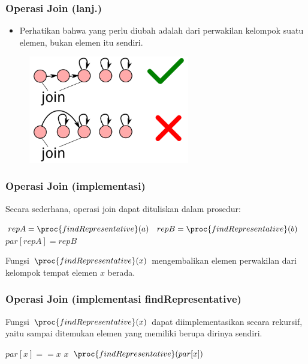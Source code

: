\begin{frame}
\frametitle{Operasi Join (lanj.)}
\begin{itemize}
  \item Perhatikan bahwa yang perlu diubah adalah  dari perwakilan kelompok suatu elemen, bukan elemen itu sendiri.
\end{itemize}
\begin{figure}
  \includegraphics[width=7cm]{asset/djs-join-2.pdf}
\end{figure}
\end{frame}

\begin{frame}
\frametitle{Operasi Join (implementasi)}
Secara sederhana, operasi join dapat dituliskan dalam prosedur:

\begin{codebox}
\li $repA = \proc{findRepresentative}(a)$
\li $repB = \proc{findRepresentative}(b)$
\li $par[repA] = repB$
\end{codebox}

Fungsi $\proc{findRepresentative}(x)$ mengembalikan elemen perwakilan dari kelompok tempat elemen $x$ berada.
\end{frame}

\begin{frame}
\frametitle{Operasi Join (implementasi findRepresentative)}
Fungsi $\proc{findRepresentative}(x)$ dapat diimplementasikan secara rekursif, yaitu sampai ditemukan elemen yang memiliki  berupa dirinya sendiri.

\begin{codebox}
\li \If $par[x] == x$ \Then
\li   \Return $x$
\li \Else
\li   \Return $\proc{findRepresentative}(par[x])$
    \End
\end{codebox}
\end{frame}

